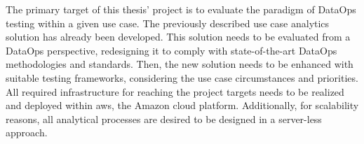 The primary target of this thesis' project is to evaluate the paradigm of DataOps testing within a given use case. The previously described use case analytics solution has already been developed. This solution needs to be evaluated from a DataOps perspective, redesigning it to comply with state-of-the-art DataOps methodologies and standards. Then, the new solution needs to be enhanced with suitable testing frameworks, considering the use case circumstances and priorities. All required infrastructure for reaching the project targets needs to be realized and deployed within \ac{aws}, the Amazon cloud platform. Additionally, for scalability reasons, all analytical processes are desired to be designed in a server-less approach.